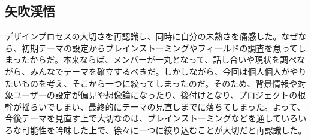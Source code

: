 \documentclass[openany,11pt,papersize]{jsbook}
\begin{document}
\subsection{矢吹渓悟}
デザインプロセスの大切さを再認識し、同時に自分の未熟さを痛感した。なぜなら、初期テーマの設定からブレインストーミングやフィールドの調査を怠ってしまったからだ。本来ならば、メンバーが一丸となって、話し合いや現状を調べながら、みんなでテーマを確立するべきだ。しかしながら、今回は個人個人がやりたいものを考え、そこから一つに絞ってしまったのだ。そのため、背景情報や対象ユーザーの設定が偏見や想像論になったり、後付けとなり、プロジェクトの根幹が揺らいでしまい、最終的にテーマの見直しまでに落ちてしまった。よって、今後テーマを見直す上で大切なのは、ブレインストーミングなどを通していろいろな可能性を吟味した上で、徐々に一つに絞り込むことが大切だと再認識した。
\end{document}
